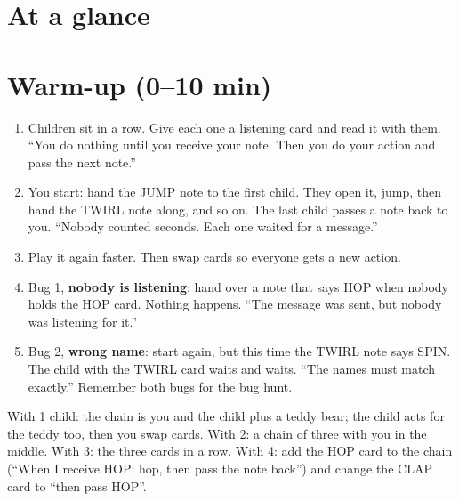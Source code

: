 \section{At a glance}
\begin{timeplan}
\end{timeplan}

\section{Warm-up (0--10 min)}
\begin{unplugged}
\begin{enumerate}[leftmargin=1.4em,itemsep=1pt]
  \item Children sit in a row. Give each one a listening card and read it with them. \enquote{You do nothing until you receive your note. Then you do your action and pass the next note.}
  \item You start: hand the JUMP note to the first child. They open it, jump, then hand the TWIRL note along, and so on. The last child passes a note back to you. \enquote{Nobody counted seconds. Each one waited for a message.}
  \item Play it again faster. Then swap cards so everyone gets a new action.
  \item Bug 1, \textbf{nobody is listening}: hand over a note that says HOP when nobody holds the HOP card. Nothing happens. \enquote{The message was sent, but nobody was listening for it.}
  \item Bug 2, \textbf{wrong name}: start again, but this time the TWIRL note says SPIN. The child with the TWIRL card waits and waits. \enquote{The names must match exactly.} Remember both bugs for the bug hunt.
\end{enumerate}
With 1 child: the chain is you and the child plus a teddy bear; the child acts for the teddy too, then you swap cards. With 2: a chain of three with you in the middle. With 3: the three cards in a row. With 4: add the HOP card to the chain (\enquote{When I receive HOP: hop, then pass the note back}) and change the CLAP card to \enquote{then pass HOP}.
\end{unplugged}

